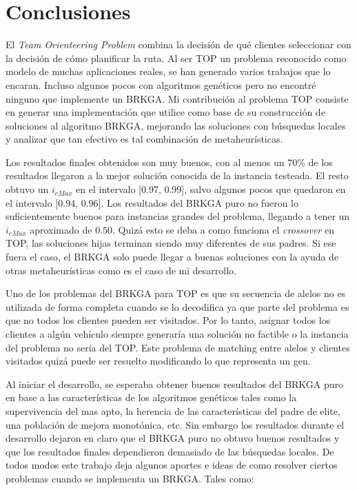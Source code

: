 \chapter{Conclusiones}

\bigskip

El \textit{Team Orienteering Problem} combina la decisión de qué clientes seleccionar con la decisión de cómo planificar la ruta. Al ser TOP un problema reconocido como modelo de muchas aplicaciones reales, se han generado varios trabajos que lo encaran. Incluso algunos pocos con algoritmos genéticos pero no encontré ninguno que implemente un BRKGA. Mi contribución al problema TOP consiste en generar una implementación que utilice como base de su construcción de soluciones al algoritmo BRKGA, mejorando las soluciones con búsquedas locales y analizar que tan efectivo es tal combinación de metaheurísticas.

\bigskip

Los resultados finales obtenidos son muy buenos, con al menos un 70\% de los resultados llegaron a la mejor solución conocida de la instancia testeada. El resto obtuvo un $i_{eMax}$ en el intervalo [0.97, 0.99], salvo algunos pocos que quedaron en el intervalo [0.94, 0.96]. Los resultados del BRKGA puro no fueron lo suficientemente buenos para instancias grandes del problema, llegando a tener un $i_{eMax}$ aproximado de $0.50$. Quizá esto se deba a como funciona el \textit{crossover} en TOP, las soluciones hijas terminan siendo muy diferentes de sus padres. Si ese fuera el caso, el BRKGA solo puede llegar a buenas soluciones con la ayuda de otras metaheurísticas como es el caso de mi desarrollo.

\bigskip

Uno de los problemas del BRKGA para TOP es que su secuencia de alelos no es utilizada de forma completa cuando se lo decodifica ya que parte del problema es que no todos los clientes pueden ser visitados. Por lo tanto, asignar todos los clientes a algún vehículo siempre generaría una solución no factible o la instancia del problema no sería del TOP. Este problema de matching entre alelos y clientes visitados quizá puede ser resuelto modificando lo que representa un gen. 

\bigskip

Al iniciar el desarrollo, se esperaba obtener buenos resultados del BRKGA puro en base a las características de los algoritmos genéticos tales como la supervivencia del mas apto, la herencia de las características del padre de elite, una población de mejora monotónica, etc. Sin embargo los resultados durante el desarrollo dejaron en claro que el BRKGA puro no obtuvo buenos resultados y que los resultados finales dependieron demasiado de las búsquedas locales. De todos modos este trabajo deja algunos aportes e ideas de como resolver ciertos problemas cuando se implementa un BRKGA. Tales como:

